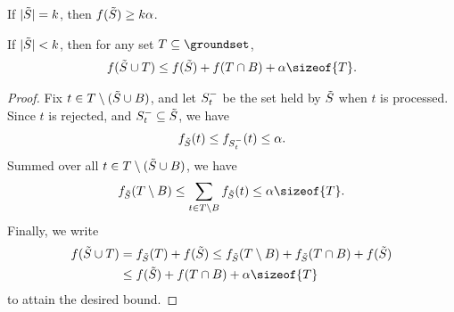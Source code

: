 \documentclass[oneside,letterpaper]{scrartcl} \usepackage{macros}
\begin{document}
\newcommand{\sizeoffinalset}{|\finalset|}
\begin{lemma}  If $\sizeoffinalset = k$, then $f(\tilde{S}) \geq k \alpha$.
\end{lemma}

\begin{lemma}
   If $\sizeoffinalset < k$, then for any set $T \subseteq \groundset$,
  \begin{align*}
    f(\finalset \cup T) \leq f(\finalset) + f(T \cap B) + \alpha \sizeof{T}.
  \end{align*}
\end{lemma}
\begin{proof}
  Fix $t \in T \setminus (\tilde{S} \cup B)$, and let $S_{t}^-$
  be the set held by $\tilde{S}$ when $t$ is processed. Since $t$ is
  rejected, and $S_t^- \subseteq \tilde{S}$, we have
  \begin{align*}
    f_{\tilde{S}}(t) \leq f_{S_{t}^-}(t) \leq \alpha.
  \end{align*}
  Summed over all $t \in T \setminus (\tilde{S} \cup B)$, we have
  \begin{align*}
    f_{\finalset}(T \setminus B) \leq \sum_{t \in T \setminus B } f_{\finalset}(t) \leq \alpha \sizeof{T}.
  \end{align*}
  Finally, we write
  \begin{align*}
    f(\finalset \cup T) &= f_{\finalset}(T) + f(\finalset) \leq f_{\finalset}(T \setminus B) + f_{\finalset}(T \cap B) +
    f(\finalset) \\
    &\leq f(\finalset) + f(T \cap B) + \alpha \sizeof{T}
  \end{align*} to attain the desired bound.
\end{proof}
\end{document}
